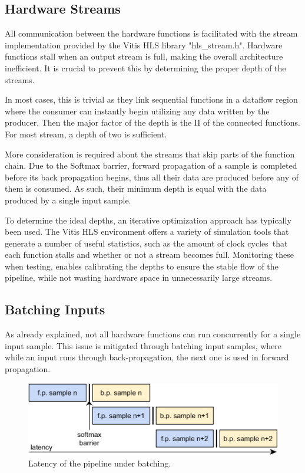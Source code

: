 \subsection{Hardware Streams}
All communication between the hardware functions is facilitated with the stream implementation provided by the Vitis HLS library "hls\_stream.h". Hardware functions stall when an output stream is full, making the overall architecture inefficient. It is crucial to prevent this by determining the proper depth of the streams.

In most cases, this is trivial as they link sequential functions in a dataflow region where the consumer can instantly begin utilizing any data written by the producer. Then the major factor of the depth is the II of the connected functions. For most stream, a depth of two is sufficient.

More consideration is required about the streams that skip parts of the function chain. Due to the Softmax barrier, forward propagation of a sample is completed before its back propagation begins, thus all their data are produced before any of them is consumed. As such, their minimum depth is equal with the data produced by a single input sample.

To determine the ideal depths, an iterative optimization approach has typically been used. The Vitis HLS environment offers a variety of simulation tools that generate a number of useful statistics, such as the amount of clock cycles that each function stalls and whether or not a stream becomes full. Monitoring these when testing, enables calibrating the depths to ensure the stable flow of the pipeline, while not wasting hardware space in unnecessarily large streams.

\subsection{Batching Inputs}
As already explained, not all hardware functions can run concurrently for a single input sample. This issue is mitigated through batching input samples, where while an input runs through back-propagation, the next one is used in forward propagation. %

\begin{figure}[H]
    \centering
        \includegraphics[width=\textwidth]{Images/diagrams/pipeline_under_batching.png}
        \decoRule
        \caption[Pipeline with batching latency]{Latency of the pipeline under batching.}
        \label{fig: Batching Pipeline latency}
\end{figure}

